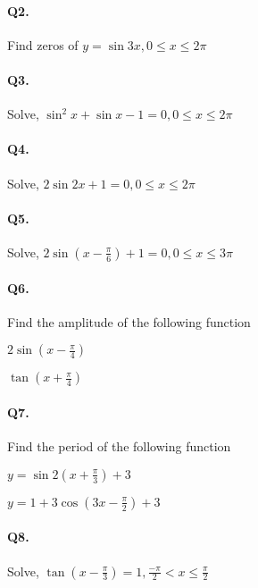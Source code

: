 \documentclass{article}
\begin{document}
\paragraph{Q2.}
Find zeros of $y = \sin 3x, 0 \leq x \leq 2\pi$

\paragraph{Q3.}
Solve, $\sin^{2}x + \sin x - 1=0, 0 \leq x \leq 2\pi$

\paragraph{Q4.}
Solve, $2\sin 2x + 1=0, 0 \leq x \leq 2\pi$

\paragraph{Q5.}
Solve, $2\sin \left( x - \frac{\pi}{6} \right) + 1=0, 0 \leq x \leq 3\pi$

\paragraph{Q6.}
Find the amplitude of the following function

\begin{enumerate*}[label=(\alph*)]
  \item $2\sin \left( x - \frac{\pi}{4} \right)$
  \item $\tan \left( x + \frac{\pi}{4} \right)$
\end{enumerate*}

\paragraph{Q7.}
Find the period of the following function

\begin{enumerate*}[label=(\alph*)]
  \item $y = \sin 2\left( x + \frac{\pi}{3} \right)+3$
  \item $y = 1+3\cos \left( 3x - \frac{\pi}{2} \right)+3$
\end{enumerate*}

\paragraph{Q8.}
Solve, $\tan \left( x-\frac{\pi}{3} \right)=1, \frac{-\pi}{2} < x \leq \frac{\pi}{2}$
\end{document}
